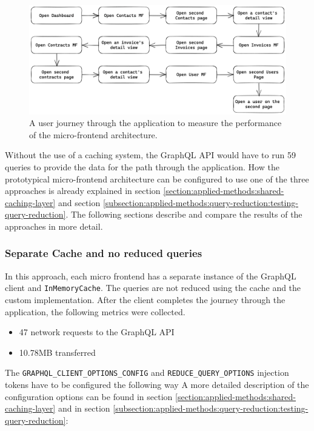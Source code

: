 \ifshowImages
\begin{figure}[H]
\centering
\includegraphics[width=1\linewidth]{images/results/evaluation-first-path.png}
\caption{A user journey through the application to measure the performance of the micro-frontend architecture.}\label{fig:results:evaluation-first-path}
\end{figure}
\fi

\noindent Without the use of a caching system, the GraphQL \ac{API} would have to run 59 queries to provide the data for the path through the application. How the prototypical micro-frontend architecture can be configured to use one of the three approaches is already explained in section \ref{section:applied-methods:shared-caching-layer} and section \ref{subsection:applied-methods:query-reduction:testing-query-reduction}. The following sections describe and compare the results of the approaches in more detail.

\subsubsection{Separate Cache and no reduced queries}\label{subsubsection:results:performance-measurement:separate-cache-no-reduction}

In this approach, each micro frontend has a separate instance of the GraphQL client and \texttt{InMemoryCache}. The queries are not reduced using the cache and the custom implementation. After the client completes the journey through the application, the following metrics were collected.

\begin{itemize}
  \item 47 network requests to the GraphQL \ac{API}
  \item 10.78MB transferred
\end{itemize}

\noindent The \texttt{GRAPHQL\_CLIENT\_OPTIONS\_CONFIG} and \texttt{REDUCE\_QUERY\_OPTIONS} injection tokens have to be configured the following way A more detailed description of the configuration options can be found in section \ref{section:applied-methods:shared-caching-layer} and in section \ref{subsection:applied-methods:query-reduction:testing-query-reduction}:

